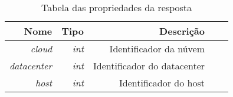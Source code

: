 \begin{table}[!htb]
    \centering
    \caption[Representação do Host de Resposta]{Tabela das propriedades da resposta
    \label{tab:tabela-optimization}}
    \begin{tabular}{rrrrr}
        \toprule
            Nome & Tipo & Descrição \\ 
        \midrule
            \textit{cloud} & \textit{int} & Identificador da núvem \\
            \textit{datacenter} & \textit{int} & Identificador do datacenter \\
            \textit{host} & \textit{int} & Identificador do host \\
        \bottomrule
    \end{tabular}
\end{table}
